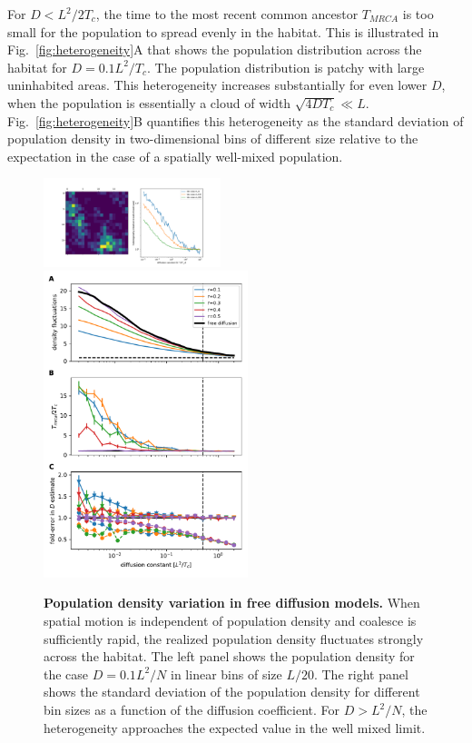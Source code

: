 \documentclass[aps,rmp, twocolumn]{revtex4}
\begin{document}
For $D<L^2/2T_c$, the time to the most recent common ancestor $T_{MRCA}$ is too small for the population to spread evenly in the habitat.
This is illustrated in Fig.~\ref{fig:heterogeneity}A that shows the population distribution across the habitat for $D=0.1L^2/T_c$.
The population distribution is patchy with large uninhabited areas.
This heterogeneity increases substantially for even lower $D$, when the population is essentially a cloud of width $\sqrt{4DT_c}\ll L$.
Fig.~\ref{fig:heterogeneity}B quantifies this heterogeneity as the standard deviation of population density in two-dimensional bins of different size  relative to the expectation in the case of a spatially well-mixed population.


\begin{figure}
    \includegraphics[width=0.46\textwidth]{figures/heterogeneity_free_diffusion}
    \includegraphics[width=0.53\textwidth]{figures/stable_density}
    \caption{\label{fig:density_reg}  {\bf Population density variation in free diffusion models.}
    When spatial motion is independent of population density and coalesce is sufficiently rapid, the realized population density fluctuates strongly across the habitat. The left panel shows the population density for the case $D = 0.1 L^2/N$ in linear bins of size $L/20$. The right panel shows the standard deviation of the population density for different bin sizes as a function of the diffusion coefficient. For $D>L^2/N$, the heterogeneity approaches the expected value in the well mixed limit.
}
\end{figure}
\end{document}

